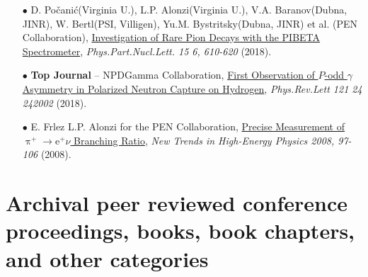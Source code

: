 \documentclass{article}[10pt]
\begin{document}
\begin{itemize}
\item [$\bullet$] D. Počanić(Virginia U.), L.P. Alonzi(Virginia U.), V.A. Baranov(Dubna, JINR), W. Bertl(PSI, Villigen), Yu.M. Bystritsky(Dubna, JINR) et al. (PEN Collaboration), \href{https://inspirehep.net/literature/1705214}{Investigation of Rare Pion Decays with the PIBETA Spectrometer}, \emph{Phys.Part.Nucl.Lett. 15 6, 610-620} (2018).

\item [$\bullet$] {\bf \LARGE Top Journal} -- NPDGamma Collaboration, \href{https://inspirehep.net/literature/1683923}{First Observation of $P$-odd $\gamma$ Asymmetry in Polarized Neutron Capture on Hydrogen}, \emph{Phys.Rev.Lett 121 24 242002} (2018).

\item [$\bullet$] E. Frlez L.P. Alonzi for the PEN Collaboration, \href{https://inspirehep.net/literature/805323}{Precise Measurement of $\uppi^{+}\rightarrow\mathrm{e}^{+}\nu$ Branching Ratio}, \emph{New Trends in High-Energy Physics 2008, 97-106} (2008).


\end{itemize}

\section*{Archival peer reviewed conference proceedings, books, book chapters, and other categories}
\end{document}
